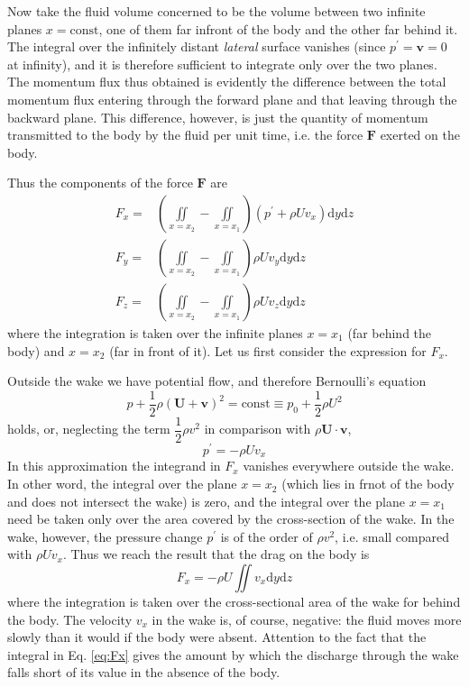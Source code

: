 \documentclass[conference]{IEEEtran}
\theoremstyle{definition}
\theoremstyle{remark}
\begin{document}
    Now take the fluid volume concerned to be the volume between two infinite planes $x = \text{const}$, one of them far infront of the body and the other far behind it. The integral over the infinitely distant \emph{lateral} surface vanishes (since $p^\prime = \mathbf{v} = 0$ at infinity), and it is therefore sufficient to integrate only over the two planes. The momentum flux thus obtained is evidently the difference between the total momentum flux entering through the forward plane and that leaving through the backward plane. This difference, however, is just the quantity of momentum transmitted to the body by the fluid per unit time, i.e. the force $\mathbf{F}$ exerted on the body.

    Thus the components of the force $\mathbf{F}$ are
    \begin{align*}
        F_x =& \left( \iint\limits_{x = x_2} - \iint\limits_{x = x_1} \right) (p^\prime + \rho U v_x) \mathrm{d} y \mathrm{d} z \\
        F_y =& \left( \iint\limits_{x = x_2} - \iint\limits_{x = x_1} \right) \rho U v_y \mathrm{d} y \mathrm{d} z \\
        F_z =& \left( \iint\limits_{x = x_2} - \iint\limits_{x = x_1} \right) \rho U v_z \mathrm{d} y \mathrm{d} z
    \end{align*}
    where the integration is taken over the infinite planes $x = x_1$ (far behind the body) and $x = x_2$ (far in front of it). Let us first consider the expression for $F_x$.

    Outside the wake we have potential flow, and therefore Bernoulli's equation
    \begin{equation*}
        p + \dfrac12 \rho (\mathbf{U} + \mathbf{v})^2 = \text{const} \equiv p_0 + \dfrac12 \rho U^2
    \end{equation*}
    holds, or, neglecting the term $\dfrac12 \rho v^2$ in comparison with $\rho \mathbf{U} \cdot \mathbf{v}$,
    \begin{equation*}
        p^\prime = -\rho U v_x
    \end{equation*}
    In this approximation the integrand in $F_x$ vanishes everywhere outside the wake. In other word, the integral over the plane $x = x_2$ (which lies in frnot of the body and does not intersect the wake) is zero, and the integral over the plane $x = x_1$ need be taken only over the area covered by the cross-section of the wake. In the wake, however, the pressure change $p^\prime$ is of the order of $\rho v^2$, i.e. small compared with $\rho Uv_x$. Thus we reach the result that the drag on the body is
    \begin{equation}
        F_x = -\rho U \iint v_x \mathrm{d} y \mathrm{d} z
        \label{eq:Fx}
    \end{equation}
    where the integration is taken over the cross-sectional area of the wake for behind the body. The velocity $v_x$ in the wake is, of course, negative: the fluid moves more slowly than it would if the body were absent. Attention to the fact that the integral in Eq. \ref{eq:Fx} gives the amount by which the discharge through the wake falls short of its value in the absence of the body.
    
\end{document}
